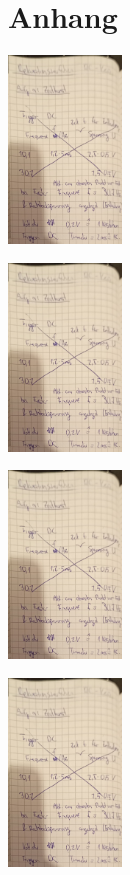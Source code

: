 \section*{Anhang}

\begin{minipage}[t]{0.4\textwidth}
    \includegraphics[height=5cm, page=1]{Inhalte/E01_RC-Relax-scan.pdf}
\end{minipage}
\begin{minipage}[t]{0.4\textwidth}
    \includegraphics[height=5cm, keepaspectratio, page=2]{Inhalte/E01_RC-Relax-scan.pdf}
\end{minipage}

\begin{minipage}[t]{0.4\textwidth}
    \includegraphics[height=5cm, page=3]{Inhalte/E01_RC-Relax-scan.pdf}
\end{minipage}
\begin{minipage}[t]{0.4\textwidth}
    \includegraphics[height=5cm, page=4]{Inhalte/E01_RC-Relax-scan.pdf}
\end{minipage}

